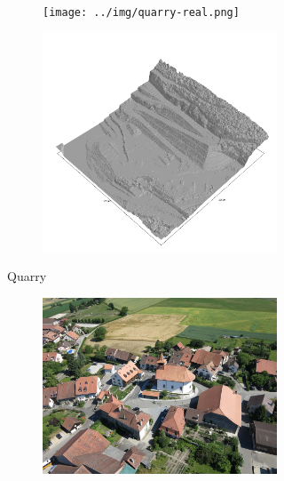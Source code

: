 \documentclass[../document.tex]{subfiles}
\begin{document}
\begin{figure}[htbp]
    \centering
    \begin{subfigure}[b]{1\textwidth}
    \begin{subfigure}[b]{0.45\textwidth}
        \texttt{[image: ../img/quarry-real.png]}
    \end{subfigure}
    \begin{subfigure}[b]{0.45\textwidth}
        \includegraphics[width=\textwidth]{../img/hm3d_borders/querry-big-10.png}
    \end{subfigure}
    \caption{Quarry}
\end{subfigure}
\begin{subfigure}[b]{1\textwidth}
    \begin{subfigure}[b]{0.45\textwidth}
        \includegraphics[width=\textwidth]{../img/sullens-real.jpg}

\end{subfigure}
\end{subfigure}
\end{figure}
\end{document}
